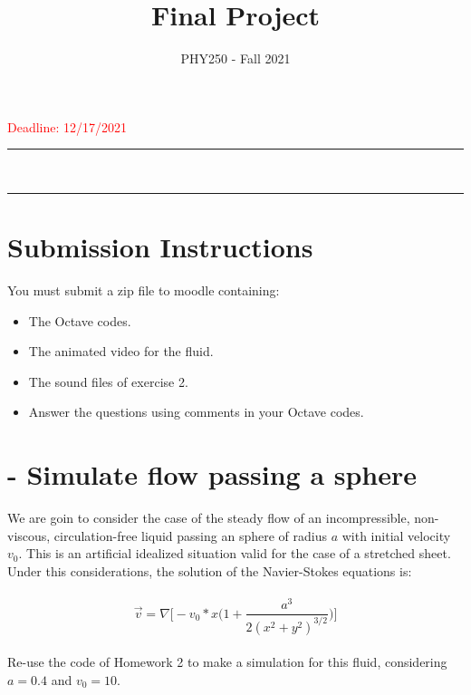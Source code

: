\documentclass[12pt]{article}
\title{Final Project}
\author{PHY250 - Fall 2021}
\date{}
\newcommand{\HRule}{\rule{\linewidth}{0.5mm}}
\begin{document}
\maketitle

\textcolor{red}{Deadline: 12/17/2021}

\vspace{5mm}

\begin{spacing}{0.3}
    \noindent
    \HRule\\
    \HRule
\end{spacing}
\vspace{5mm}




\section*{Submission Instructions}

You must submit a zip file to moodle containing:
\vspace{3mm}

\begin{itemize}
\item The Octave codes.
\item The animated video for the fluid.
\item The sound files of exercise 2.
\item Answer the questions using comments in your Octave codes.
\end{itemize}

\vspace{10mm}




\setcounter{example}{1}

\section*{ \theexample- Simulate  flow  passing a sphere}
We are goin to consider  the case of the steady flow of an incompressible, non-viscous, circulation-free liquid passing an sphere of radius $a$ with initial velocity $v_0$.
This is an artificial idealized situation valid for the case of a stretched sheet. Under this considerations, the solution of the Navier-Stokes equations is:\\
\vspace{3mm}
\\
\begin{equation*}
    \vec{v}=\nabla \bigg[-v_0*x\bigg(1+\frac{a^3}{2(x^2+y^2)^{3/2}}\bigg)\bigg]
\end{equation*}
\vspace{6mm}
\\
Re-use the code of Homework 2 to make a simulation for this fluid, considering  $a=0.4$ and $v_0=10$.
\end{document}
